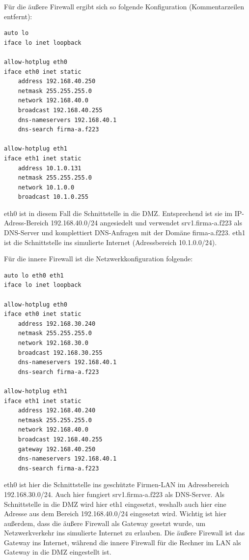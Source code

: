 Für die äußere Firewall ergibt sich so folgende Konfiguration (Kommentarzeilen entfernt):
\begin{lstlisting}
auto lo
iface lo inet loopback

allow-hotplug eth0
iface eth0 inet static
	address 192.168.40.250
	netmask 255.255.255.0
	network 192.168.40.0
	broadcast 192.168.40.255
	dns-nameservers 192.168.40.1
	dns-search firma-a.f223

allow-hotplug eth1
iface eth1 inet static
	address 10.1.0.131
	netmask 255.255.255.0
	network 10.1.0.0
	broadcast 10.1.0.255
\end{lstlisting}
eth0 ist in diesem Fall die Schnittstelle in die DMZ. Entsprechend ist sie im IP-Adress-Bereich 192.168.40.0/24 angesiedelt und verwendet srv1.firma-a.f223 als DNS-Server und komplettiert DNS-Anfragen mit der Domäne firma-a.f223. eth1 ist die Schnittstelle ins simulierte Internet (Adressbereich 10.1.0.0/24).

Für die innere Firewall ist die Netzwerkkonfiguration folgende:
\begin{lstlisting}
auto lo eth0 eth1
iface lo inet loopback

allow-hotplug eth0
iface eth0 inet static
	address 192.168.30.240
	netmask 255.255.255.0
	network 192.168.30.0
	broadcast 192.168.30.255
	dns-nameservers 192.168.40.1
	dns-search firma-a.f223

allow-hotplug eth1
iface eth1 inet static
	address 192.168.40.240
	netmask 255.255.255.0
	network 192.168.40.0
	broadcast 192.168.40.255
	gateway 192.168.40.250
	dns-nameservers 192.168.40.1
	dns-search firma-a.f223
\end{lstlisting}

eth0 ist hier die Schnittstelle ins geschützte Firmen-LAN im Adressbereich 192.168.30.0/24. Auch hier fungiert srv1.firma-a.f223 als DNS-Server. Als Schnittstelle in die DMZ wird hier eth1 eingesetzt, weshalb auch hier eine Adresse aus dem Bereich 192.168.40.0/24 eingesetzt wird. Wichtig ist hier außerdem, dass die äußere Firewall als Gateway gesetzt wurde, um Netzwerkverkehr ins simulierte Internet zu erlauben. Die äußere Firewall ist das Gateway ins Internet, während die innere Firewall für die Rechner im LAN als Gateway in die DMZ eingestellt ist.
